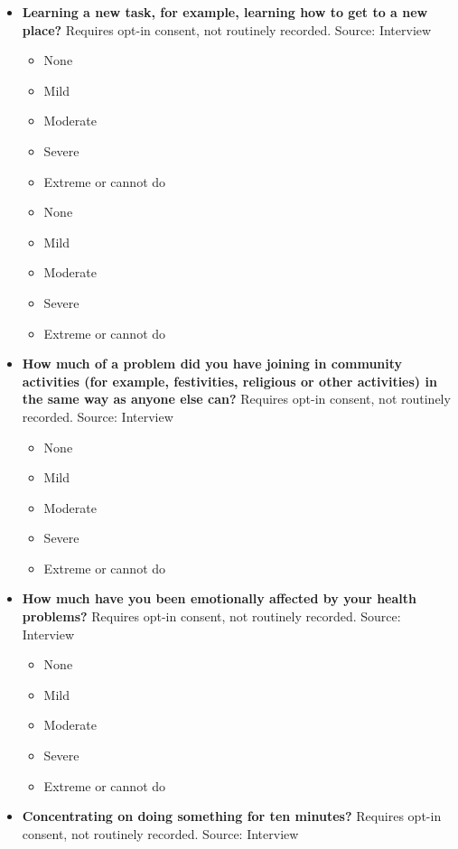 \documentclass[
]{scrartcl}
\providecommand{\tightlist}{%
  \setlength{\itemsep}{0pt}\setlength{\parskip}{0pt}}\usepackage{longtable,booktabs,array}
\begin{document}
\begin{itemize}
  \begin{itemize}
  \tightlist
  \item
    None
  \item
    Mild
  \item
    Moderate
  \item
    Severe
  \item
    Extreme or cannot do
  \end{itemize}
\item
  \textbf{Learning a new task, for example, learning how to get to a new
  place?} Requires opt-in consent, not routinely recorded. Source:
  Interview

  \begin{itemize}
  \tightlist
  \item
    None
  \item
    Mild
  \item
    Moderate
  \item
    Severe
  \item
    Extreme or cannot do
  \item
    None
  \item
    Mild
  \item
    Moderate
  \item
    Severe
  \item
    Extreme or cannot do
  \end{itemize}
\item
  \textbf{How much of a problem did you have joining in community
  activities (for example, festivities, religious or other activities)
  in the same way as anyone else can?} Requires opt-in consent, not
  routinely recorded. Source: Interview

  \begin{itemize}
  \tightlist
  \item
    None
  \item
    Mild
  \item
    Moderate
  \item
    Severe
  \item
    Extreme or cannot do
  \end{itemize}
\item
  \textbf{How much have you been emotionally affected by your health
  problems?} Requires opt-in consent, not routinely recorded. Source:
  Interview

  \begin{itemize}
  \tightlist
  \item
    None
  \item
    Mild
  \item
    Moderate
  \item
    Severe
  \item
    Extreme or cannot do
  \end{itemize}
\item
  \textbf{Concentrating on doing something for ten minutes?} Requires
  opt-in consent, not routinely recorded. Source: Interview


\end{itemize}
\end{document}

